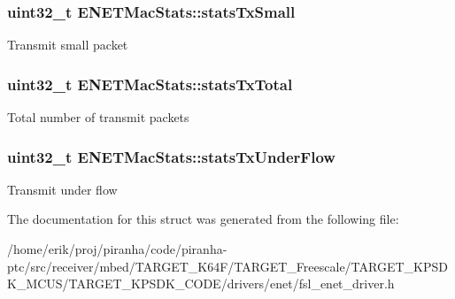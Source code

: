 \subsubsection[{\texorpdfstring{stats\+Tx\+Small}{statsTxSmall}}]{\setlength{\rightskip}{0pt plus 5cm}uint32\+\_\+t E\+N\+E\+T\+Mac\+Stats\+::stats\+Tx\+Small}\hypertarget{structENETMacStats_a40b5af899138fc64482cf4775e2595fa}{}\label{structENETMacStats_a40b5af899138fc64482cf4775e2595fa}
Transmit small packet 
\subsubsection[{\texorpdfstring{stats\+Tx\+Total}{statsTxTotal}}]{\setlength{\rightskip}{0pt plus 5cm}uint32\+\_\+t E\+N\+E\+T\+Mac\+Stats\+::stats\+Tx\+Total}\hypertarget{structENETMacStats_a5d31ececa2ce384342c824605d43b53e}{}\label{structENETMacStats_a5d31ececa2ce384342c824605d43b53e}
Total number of transmit packets 
\subsubsection[{\texorpdfstring{stats\+Tx\+Under\+Flow}{statsTxUnderFlow}}]{\setlength{\rightskip}{0pt plus 5cm}uint32\+\_\+t E\+N\+E\+T\+Mac\+Stats\+::stats\+Tx\+Under\+Flow}\hypertarget{structENETMacStats_a793f5294811cc167ac88be207029f5fe}{}\label{structENETMacStats_a793f5294811cc167ac88be207029f5fe}
Transmit under flow 

The documentation for this struct was generated from the following file\+:\begin{DoxyCompactItemize}
\item 
/home/erik/proj/piranha/code/piranha-\/ptc/src/receiver/mbed/\+T\+A\+R\+G\+E\+T\+\_\+\+K64\+F/\+T\+A\+R\+G\+E\+T\+\_\+\+Freescale/\+T\+A\+R\+G\+E\+T\+\_\+\+K\+P\+S\+D\+K\+\_\+\+M\+C\+U\+S/\+T\+A\+R\+G\+E\+T\+\_\+\+K\+P\+S\+D\+K\+\_\+\+C\+O\+D\+E/drivers/enet/fsl\+\_\+enet\+\_\+driver.\+h\end{DoxyCompactItemize}
